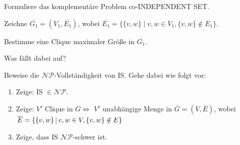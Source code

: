 \begin{frame}
{}

 {
	Formuliere das komplementäre Problem co-INDEPENDENT SET.
}

 {
	Zeichne $\overline{G_1}=(V_1, \overline{E_1})$, wobei $\overline{E_1}=\{\{v, w\} \mid v, w \in V_1, \{v,w\} \notin E_1\}$.
	
        Bestimme eine Clique maximaler Größe in $\overline{G_1}$.
        
        Was fällt dabei auf?
}

 {

Beweise die $\mathcal{NP}$-Vollständigkeit von IS. Gehe dabei wie folgt vor:
\begin{enumerate}
 \item Zeige: IS $\in \mathcal{NP}$.
 \item Zeige: $V'$ Clique in $G \Longleftrightarrow$ $V'$ unabhängige Menge in $\overline{G}=(V, \overline{E})$, wobei $\overline{E}= \left\lbrace \{v, w\} \,\middle\vert\, v, w \in V, \{v, w\} \notin E \right\rbrace$
 \item Zeige, dass IS $\mathcal{NP}$-schwer ist.
\end{enumerate}


}
\end{frame}

